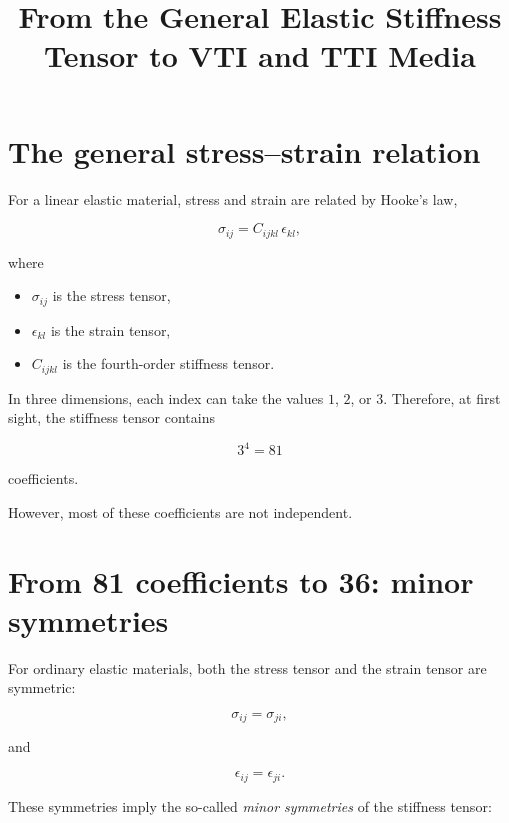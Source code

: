 \documentclass[11pt]{article}
\title{From the General Elastic Stiffness Tensor to VTI and TTI Media}
\author{}
\date{}
\begin{document}
\maketitle

\section{The general stress--strain relation}

For a linear elastic material, stress and strain are related by Hooke's law,

\begin{equation}
    \sigma_{ij} = C_{ijkl}\,\epsilon_{kl},
\end{equation}

where

\begin{itemize}
    \item $\sigma_{ij}$ is the stress tensor,
    \item $\epsilon_{kl}$ is the strain tensor,
    \item $C_{ijkl}$ is the fourth-order stiffness tensor.
\end{itemize}

In three dimensions, each index can take the values $1$, $2$, or $3$. Therefore, at first sight, the stiffness tensor contains

\begin{equation}
    3^4 = 81
\end{equation}

coefficients.

However, most of these coefficients are not independent.

\section{From 81 coefficients to 36: minor symmetries}

For ordinary elastic materials, both the stress tensor and the strain tensor are symmetric:

\begin{equation}
    \sigma_{ij} = \sigma_{ji},
\end{equation}

and

\begin{equation}
    \epsilon_{ij} = \epsilon_{ji}.
\end{equation}

These symmetries imply the so-called \emph{minor symmetries} of the stiffness tensor:
\end{document}
